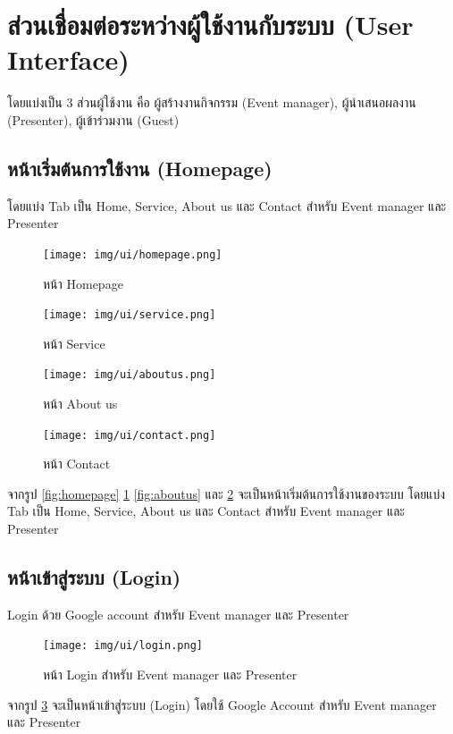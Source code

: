 \clearpage %
\section{ส่วนเชื่อมต่อระหว่างผู้ใช้งานกับระบบ (User Interface)}


โดยแบ่งเป็น 3 ส่วนผู้ใช้งาน คือ ผู้สร้างงานกิจกรรม (Event manager), ผู้นำเสนอผลงาน (Presenter), ผู้เข้าร่วมงาน (Guest)
\subsection{หน้าเริ่มต้นการใช้งาน (Homepage)}
โดยแบ่ง Tab เป็น Home, Service, About us และ Contact สำหรับ Event manager และ Presenter

\begin{figure}[h!] %
    \begin{center}
        \texttt{[image: img/ui/homepage.png]}
    \end{center}
    \caption{หน้า Homepage}
    \label{fig:homepage}

    \begin{center}
        \texttt{[image: img/ui/service.png]}
    \end{center}
    \caption{หน้า Service}
    \label{fig:service}
\end{figure}


\begin{figure}
    \begin{center}
        \texttt{[image: img/ui/aboutus.png]}
    \end{center}
    \caption{หน้า About us}
    \label{fig:aboutus}

    \begin{center}
        \texttt{[image: img/ui/contact.png]}
    \end{center}
    \caption{หน้า Contact}
    \label{fig:contact}
\end{figure}
จากรูป \ref{fig:homepage} \ref{fig:service} \ref{fig:aboutus} และ \ref{fig:contact} จะเป็นหน้าเริ่มต้นการใช้งานของระบบ โดยแบ่ง Tab เป็น Home, Service, About us และ Contact สำหรับ Event manager และ Presenter


\subsection{หน้าเข้าสู่ระบบ (Login)}
Login ด้วย Google account สำหรับ Event manager และ Presenter

\begin{figure}[h!] %
    \begin{center}
        \texttt{[image: img/ui/login.png]}
    \end{center}
    \caption{หน้า Login สำหรับ Event manager และ Presenter}
    \label{fig:login}
\end{figure}
จากรูป \ref{fig:login} จะเป็นหน้าเข้าสู่ระบบ (Login) โดยใช้ Google Account สำหรับ Event manager และ Presenter

